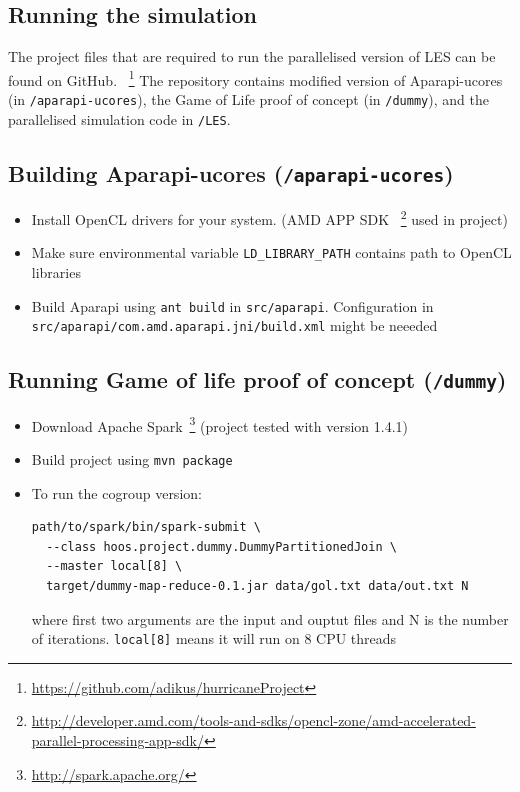 \documentclass{l4proj}
\begin{document}
\begin{appendices}

\chapter{Running the simulation}
\label{chap:running}

The project files that are required to run the parallelised version of LES can be found on GitHub.
~\footnote{\url{https://github.com/adikus/hurricaneProject}}
The repository contains modified version of Aparapi-ucores (in \texttt{/aparapi-ucores}), 
the Game of Life proof of concept (in \texttt{/dummy}),
and the parallelised simulation code in \texttt{/LES}.

\section{Building Aparapi-ucores (\texttt{/aparapi-ucores})}

\begin{itemize}
\item Install OpenCL drivers for your system. (AMD APP SDK
~\footnote{\url{http://developer.amd.com/tools-and-sdks/opencl-zone/amd-accelerated-parallel-processing-app-sdk/}} 
used in project)
\item Make sure environmental variable \texttt{LD\_LIBRARY\_PATH} contains path to OpenCL libraries
\item Build Aparapi using \texttt{ant build} in \texttt{src/aparapi}. Configuration in \\
\texttt{src/aparapi/com.amd.aparapi.jni/build.xml} might be neeeded
\end{itemize}

\section{Running Game of life proof of concept (\texttt{/dummy})}

\begin{itemize}
\item Download Apache Spark~\footnote{\url{http://spark.apache.org/}} (project tested with version 1.4.1)
\item Build project using \texttt{mvn package}
\item To run the cogroup version:
\begin{verbatim}
path/to/spark/bin/spark-submit \
  --class hoos.project.dummy.DummyPartitionedJoin \
  --master local[8] \
  target/dummy-map-reduce-0.1.jar data/gol.txt data/out.txt N
\end{verbatim}
where first two arguments are the input and ouptut files and N is the number of iterations.
\texttt{local[8]} means it will run on 8 CPU threads
\end{itemize}


\end{appendices}
\end{document}
